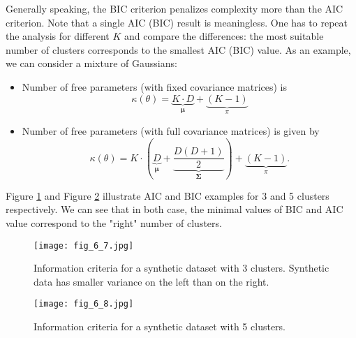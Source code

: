 \documentclass[../main.tex]{subfiles}
\begin{document}
Generally speaking, the BIC criterion penalizes complexity more than the AIC criterion. Note that a single AIC (BIC) result is meaningless. One has to repeat the analysis for different $K$ and compare the differences: the most suitable number of clusters corresponds to the smallest AIC (BIC) value. As an example, we can consider a mixture of Gaussians:
\begin{itemize}
	\item Number of free parameters (with fixed covariance matrices) is
	\begin{equation*}
	\kappa(\theta)=\underbrace{K\cdot D}_{\bm{\mu}}+\underbrace{(K-1)}_{\pi}
	\end{equation*}
	\item Number of free parameters (with full covariance matrices) is given by
	\begin{equation*}
	\kappa(\theta)=K\cdot\left(\underbrace{D}_{\bm{\mu}} +\underbrace{\frac{D(D+1)}{2}}_{\bm{\Sigma}} \right)+\underbrace{(K-1)}_{\pi}.
	\end{equation*}
\end{itemize}
Figure \ref{fig_6_7} and Figure \ref{fig_6_8} illustrate AIC and BIC examples for 3 and 5 clusters respectively. We can see that in both case, the minimal values of BIC and AIC value correspond to the "right" number of clusters.
\begin{figure}[h] 
	\centering 
	\texttt{[image: fig\_6\_7.jpg]} 
	\caption{Information criteria for a synthetic dataset with 3 clusters. Synthetic data has smaller variance on the left than on the right.}\label{fig_6_7}
\end{figure}
\begin{figure}[h] 
	\centering 
	\texttt{[image: fig\_6\_8.jpg]} 
	\caption{Information criteria for a synthetic dataset with 5 clusters.}\label{fig_6_8}
\end{figure}
\end{document}
